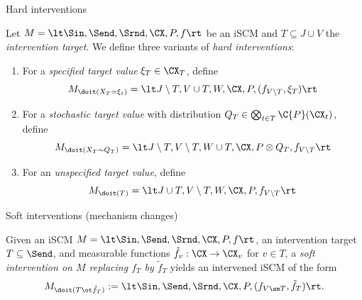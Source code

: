 \begin{frame}{Hard interventions}
  \begin{Def}[\ref{def:scm_hard_intervention}, \ref{def:scm_hard_intervention_stochastic}, \ref{def:scm_hard_intervention_unspecified}]
  Let $M = \lt \Sin, \Send, \Srnd, \CX, P, f \rt$ be an iSCM and $T \subseteq J \cup V$ the \emph{intervention target}. 
  We define three variants of \emph{hard interventions}:
    \begin{enumerate}
      \item For a \emph{specified target value} $\xi_T \in \CX_T$, define
    $$M_{\doit(X_T=\xi_t)} = \lt J\setminus T, V \cup T, W, \CX, P, (f_{V\setminus T},\xi_T)\rt$$
  \item For a \emph{stochastic target value} with distribution $Q_T \in \bigotimes_{t\in T} \C{P}(\CX_t)$, define
    $$M_{\doit(X_T\sim Q_T)} = \lt J\setminus T, V \setminus T, W \cup T, \CX, P \otimes Q_T, f_{V\setminus T}\rt$$
  \item For an \emph{unspecified target value}, define
    $$M_{\doit(T)} = \lt J\cup T, V\setminus T, W, \CX, P, f_{V\setminus T} \rt$$
    \end{enumerate}
  \end{Def}
\end{frame}

\begin{frame}{Soft interventions (mechanism changes)}
\begin{Def}[\ref{def:scm_soft_intervention}]
  Given an iSCM $M = \lt \Sin, \Send, \Srnd, \CX, P, f \rt$, an intervention target $T \subseteq \Send$, 
  and measurable functions $\tilde{f}_v : \CX \to \CX_v$ for $v \in T$,
  a \emph{soft intervention on $M$ replacing $f_T$ by $\tilde f_T$} yields an intervened iSCM of the form
  $$M_{\doit(T \ot \tilde{f}_T)} := \lt \Sin,\Send,\Srnd,\CX,P,(f_{V\sm T}, \tilde{f}_T) \rt.$$
\end{Def}
\end{frame}

